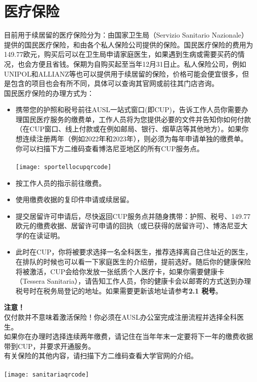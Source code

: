 \section{医疗保险}
目前用于续居留的医疗保险分为：由国家卫生局（Servizio Sanitario Nazionale）提供的国民医疗保险，和由各个私人保险公司提供的保险。国民医疗保险的费用为149.77欧元，购买后可以在卫生局申请家庭医生，如果遇到生病或需要买药的情况，也会方便且省钱。保期为自购买起至当年12月31日止。私人保险公司，例如UNIPOL和ALLIANZ等也可以提供用于续居留的保险，价格可能会便宜很多，但是包含的项目也会有所不同，具体可以查询其官网或前往其门店咨询。\\
国民医疗保险的办理方式为：
\begin{itemize}
\item 携带您的护照和税号前往AUSL一站式窗口(即CUP)，告诉工作人员你需要办理国民医疗服务的缴费单，工作人员将为您提供必要的文件并告知你如何付款（在CUP窗口、线上付款或在例如邮局、银行、烟草店等其他地方）。如果你想连续注册两年（例如2022年和2023年），则必须为每年申请单独的缴费单。你可以扫描下方二维码查看博洛尼亚地区的所有CUP服务点。\\
\\
\texttt{[image: sportellocupqrcode]}
\item 按工作人员的指示前往缴费。
\item 使用缴费收据的复印件申请或续居留。
\item 提交居留许可申请后，尽快返回CUP服务点并随身携带：护照、税号、149.77 欧元的缴费收据、居留许可申请的回执（或已获得的居留许可）、博洛尼亚大学的在读证明。
\item 此时在CUP，你将被要求选择一名全科医生，推荐选择离自己住址近的医生，在排队的时候也可以看一下家庭医生的介绍册，提前选好。随后你的健康保险将被激活，CUP会给你发放一张纸质个人医疗卡，如果你需要健康卡（Tessera Sanitaria），请告知工作人员，你的健康卡会以邮寄的方式送到办理税号时在税务局登记的地址。如果需要更新该地址请参考\textbf{2.1 税号}。
\end{itemize}
\textbf{注意！}\\
仅付款并不意味着激活保险！你必须在AUSL办公室完成注册流程并选择全科医生。\\
如果你在办理时选择连续两年缴费，请记住在当年年末一定要将下一年的缴费收据带到CUP，并要求开通服务。\\
有关保险的其他内容，请扫描下方二维码查看大学官网的介绍。\\
\\
\texttt{[image: sanitariaqrcode]}

